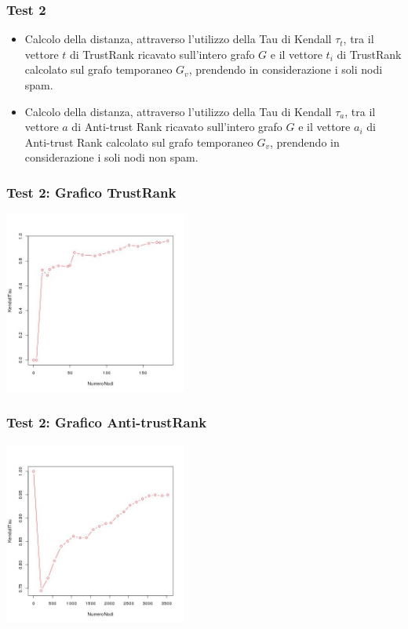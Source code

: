\documentclass{beamer}
\begin{document}
\begin{frame}
\frametitle{Test 2}
  \begin{itemize}
   \item<1-> Calcolo della distanza, attraverso l’utilizzo della Tau di Kendall \(\tau_t\), tra il vettore \(t\) di TrustRank ricavato sull’intero grafo \(G\) e il vettore \(t_i\) di TrustRank calcolato sul grafo temporaneo \(G_v\), prendendo in considerazione i soli nodi spam.
   \item<2-> Calcolo della distanza, attraverso l’utilizzo della Tau di Kendall \(\tau_a\), tra il vettore \(a\) di Anti-trust Rank ricavato sull’intero grafo \(G\) e il vettore \(a_i\) di Anti-trust Rank calcolato sul grafo temporaneo \(G_v\), prendendo in considerazione i soli nodi non spam.
  \end{itemize}
  \end{frame}
  \begin{frame}
\frametitle{Test 2: Grafico TrustRank}
\begin{center}
 \includegraphics[height=6cm]{immagini/test2/trustrankBadNodesTestMode1_62}
\end{center}
\end{frame}
  \begin{frame}
\frametitle{Test 2: Grafico Anti-trustRank}
\begin{center}
 \includegraphics[height=6cm]{immagini/test2/antiTrustraktGoodNodesTestMode1_62}
\end{center}
\end{frame}
\end{document}
